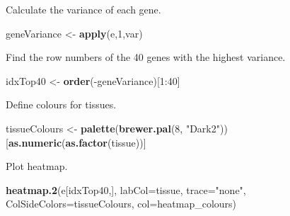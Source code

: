 \documentclass[]{book}
\newenvironment{Shaded}{\begin{snugshade}}{\end{snugshade}}
\newcommand{\KeywordTok}[1]{\textcolor[rgb]{0.13,0.29,0.53}{\textbf{{#1}}}}
\newcommand{\DataTypeTok}[1]{\textcolor[rgb]{0.13,0.29,0.53}{{#1}}}
\newcommand{\DecValTok}[1]{\textcolor[rgb]{0.00,0.00,0.81}{{#1}}}
\newcommand{\StringTok}[1]{\textcolor[rgb]{0.31,0.60,0.02}{{#1}}}
\newcommand{\NormalTok}[1]{{#1}}
\theoremstyle{definition}
\theoremstyle{definition}
\theoremstyle{definition}
\theoremstyle{remark}
\begin{document}
Calculate the variance of each gene.

\begin{Shaded}
\begin{Highlighting}[]
\NormalTok{geneVariance <-}\StringTok{ }\KeywordTok{apply}\NormalTok{(e,}\DecValTok{1}\NormalTok{,var)}
\end{Highlighting}
\end{Shaded}

Find the row numbers of the 40 genes with the highest variance.

\begin{Shaded}
\begin{Highlighting}[]
\NormalTok{idxTop40 <-}\StringTok{ }\KeywordTok{order}\NormalTok{(-geneVariance)[}\DecValTok{1}\NormalTok{:}\DecValTok{40}\NormalTok{]}
\end{Highlighting}
\end{Shaded}

Define colours for tissues.

\begin{Shaded}
\begin{Highlighting}[]
\NormalTok{tissueColours <-}\StringTok{ }\KeywordTok{palette}\NormalTok{(}\KeywordTok{brewer.pal}\NormalTok{(}\DecValTok{8}\NormalTok{, }\StringTok{"Dark2"}\NormalTok{))[}\KeywordTok{as.numeric}\NormalTok{(}\KeywordTok{as.factor}\NormalTok{(tissue))]}
\end{Highlighting}
\end{Shaded}

Plot heatmap.

\begin{Shaded}
\begin{Highlighting}[]
\KeywordTok{heatmap.2}\NormalTok{(e[idxTop40,], }\DataTypeTok{labCol=}\NormalTok{tissue, }\DataTypeTok{trace=}\StringTok{"none"}\NormalTok{,}
          \DataTypeTok{ColSideColors=}\NormalTok{tissueColours, }\DataTypeTok{col=}\NormalTok{heatmap_colours)}
\end{Highlighting}
\end{Shaded}
\end{document}
